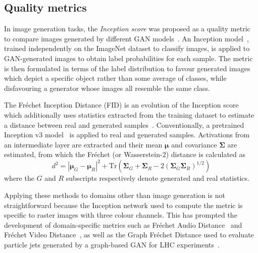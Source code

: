\subsection{Quality metrics}\label{sec:quality_metrics} %
In image generation tasks, the \emph{Inception score} was proposed as a quality
metric to compare images generated by different GAN
models~\cite{salimans_improved_2016}. 
An Inception model~\cite{7298594}, trained independently on the ImageNet dataset
to classify images, is applied to GAN-generated images to obtain label
probabilities for each sample. The metric is then formulated in terms of the label
distribution to favour generated images which depict a specific object rather than
some average of classes, while disfavouring a generator whose images all resemble
the same class.


The Fréchet Inception Distance (FID) is an evolution of the Inception score
which additionally uses statistics extracted from the training dataset to
estimate a distance between real and generated
samples~\cite{10.5555/3295222.3295408}. Conventionally, a pretrained Inception
v3 model~\cite{7780677} is applied to real and generated samples. Activations
from an intermediate layer are extracted and their mean $\bm{\mu}$ and
covariance $\bm{\Sigma}$ are estimated, from which the Fréchet (or
Wasserstein-2) distance is calculated as
$$
d^2 = | \bm{\mu}_G - \bm{\mu}_R |^2 + 
    \mathrm{Tr}(\bm{\Sigma}_G + \bm{\Sigma}_R - 
    2(\bm{\Sigma}_G \bm{\Sigma}_R)^{1/2})
$$
where the $G$ and $R$ subscripts respectively denote generated and real statistics.

Applying these methods to domains other than image generation is not
straightforward because the Inception network used to compute the metric is
specific to raster images with three colour channels. This has prompted the
development of domain-specific metrics such as Fréchet Audio
Distance~\cite{kilgour19_interspeech} and Fréchet Video
Distance~\cite{Unterthiner2018TowardsAG}, as well as the Graph Fréchet Distance
used to evaluate particle jets generated by a graph-based GAN for LHC
experiments~\cite{kansal2020graph}.

